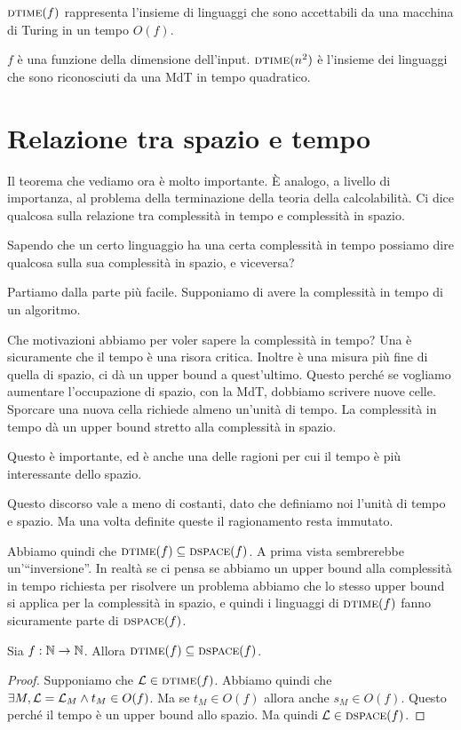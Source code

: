 $\textsc{dtime}(f)$ rappresenta l'insieme di linguaggi che sono accettabili da una macchina di Turing in un
tempo $O(f)$.

$f$ è una funzione della dimensione dell'input. $\textsc{dtime}(n^{2})$ è l'insieme dei linguaggi che sono
riconosciuti da una MdT in tempo quadratico.

\section{Relazione tra spazio e tempo}

Il teorema che vediamo ora è molto importante. È analogo, a livello di importanza, al problema
della terminazione della teoria della calcolabilità. Ci dice qualcosa sulla relazione tra
complessità in tempo e complessità in spazio.

Sapendo che un certo linguaggio ha una certa complessità in tempo possiamo dire qualcosa sulla sua
complessità in spazio, e viceversa?

Partiamo dalla parte più facile. Supponiamo di avere la complessità in tempo di un algoritmo.

Che motivazioni abbiamo per voler sapere la complessità in tempo? Una è sicuramente che il tempo è
una risora critica. Inoltre è una misura più fine di quella di spazio, ci dà un upper bound a
quest'ultimo. Questo perché se vogliamo aumentare l'occupazione di spazio, con la MdT, dobbiamo
scrivere nuove celle. Sporcare una nuova cella richiede almeno un'unità di tempo. La complessità in
tempo dà un upper bound stretto alla complessità in spazio.

Questo è importante, ed è anche una delle ragioni per cui il tempo è più interessante dello
spazio.

Questo discorso vale a meno di costanti, dato che definiamo noi l'unità di tempo e spazio. Ma una
volta definite queste il ragionamento resta immutato.

Abbiamo quindi che $\textsc{dtime}(f) \subseteq \textsc{dspace}(f)$. A prima vista sembrerebbe un'``inversione''. In
realtà se ci pensa se abbiamo un upper bound alla complessità in tempo richiesta per risolvere un
problema abbiamo che lo stesso upper bound si applica per la complessità in spazio, e quindi i
linguaggi di $\textsc{dtime}(f)$ fanno sicuramente parte di $\textsc{dspace}(f)$.

\begin{thm}
    Sia $f: \mathbb{N} \to \mathbb{N}$. Allora $\textsc{dtime}(f) \subseteq \textsc{dspace}(f)$.
\end{thm}
\begin{proof}
    Supponiamo che $\mathcal{L} \in \textsc{dtime}(f)$. Abbiamo quindi che $\exists M, \mathcal{L} = \mathcal{L}_{M} \land
    t_{M} \in O(f)$. Ma se $t_{M} \in O(f)$ allora anche $s_{M} \in O(f)$. Questo perché il tempo
    è un upper bound allo spazio. Ma quindi $\mathcal{L} \in \textsc{dspace}(f)$.
\end{proof}

